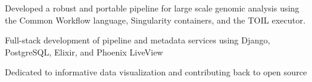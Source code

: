 \documentclass[letterpaper]{resume} %
\begin{document}
\vspace{2 mm}
\hfill
{}
\hfill
{}
\vspace{1 mm}
\begin{tightitemize}

	
	\item Developed a robust and portable pipeline for large scale genomic analysis using the Common Workflow language, Singularity containers, and the TOIL executor.
	\item Full-stack development of pipeline and metadata services using Django, PostgreSQL, Elixir, and Phoenix LiveView 
	\item Dedicated to informative data visualization and contributing back to open source
\end{tightitemize}
\end{document}
